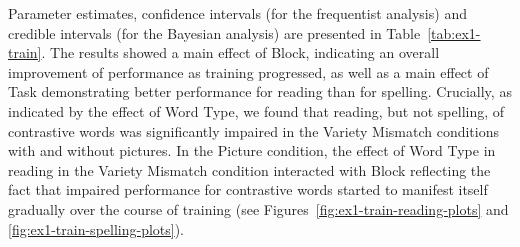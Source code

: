 \documentclass[doc,floatsintext]{apa6}
\begin{document}
Parameter estimates, confidence intervals (for the frequentist analysis)
and credible intervals (for the Bayesian analysis) are presented in
Table~\ref{tab:ex1-train}. The results showed a main effect of Block,
indicating an overall improvement of performance as training progressed,
as well as a main effect of Task demonstrating better performance for
reading than for spelling. Crucially, as indicated by the effect of Word
Type, we found that reading, but not spelling, of contrastive words was
significantly impaired in the Variety Mismatch conditions with and
without pictures. In the Picture condition, the effect of Word Type in
reading in the Variety Mismatch condition interacted with Block
reflecting the fact that impaired performance for contrastive words
started to manifest itself gradually over the course of training (see
Figures~\ref{fig:ex1-train-reading-plots} and
\ref{fig:ex1-train-spelling-plots}).

\newpage
\end{document}
